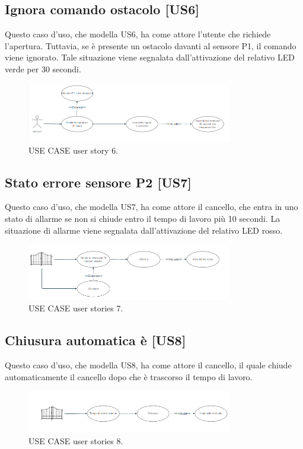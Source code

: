 \documentclass[12pt]{article}
\begin{document}
\subsection{Ignora comando ostacolo [US6]}
Questo caso d'uso, che modella US6, ha come attore l'utente che richiede l'apertura. Tuttavia, se è presente un ostacolo davanti al sensore P1, il comando viene ignorato. Tale situazione viene segnalata dall'attivazione del relativo LED verde per 30 secondi.
    \begin{figure}[h]
        \centering
        \includegraphics[width=0.8\textwidth]{use_case_us6.PNG}
        \caption{USE CASE user story 6.}
        \label{fig:use_case_us6}
    \end{figure}

\subsection{Stato errore sensore P2 [US7]}
Questo caso d'uso, che modella US7, ha come attore il cancello, che entra in uno stato di allarme se non si chiude entro il tempo di lavoro più 10 secondi. La situazione di allarme viene segnalata dall'attivazione del relativo LED rosso.
\begin{figure}[H]
    \centering
    \includegraphics[width=0.8\textwidth]{use_case_us7.PNG}
    \caption{USE CASE user stories 7.}
    \label{fig:use_case_us7}
\end{figure}
\subsection{Chiusura automatica è [US8]}
Questo caso d'uso, che modella US8, ha come attore il cancello, il quale chiude automaticamente il cancello dopo che è trascorso il tempo di lavoro.
    \begin{figure}[H]
        \centering
        \includegraphics[width=0.8\textwidth]{use_case_us8.PNG}
        \caption{USE CASE user stories 8.}
        \label{fig:use_case_us8}
    \end{figure}
\end{document}
